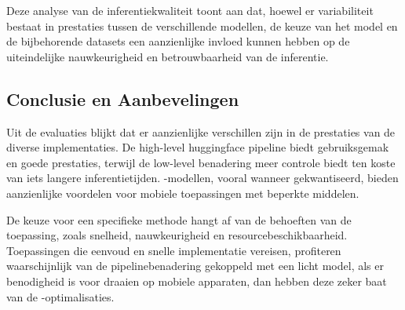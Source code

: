 Deze analyse van de inferentiekwaliteit toont aan dat, hoewel er variabiliteit bestaat in prestaties tussen de verschillende modellen, de keuze van het model en de bijbehorende datasets een aanzienlijke invloed kunnen hebben op de uiteindelijke nauwkeurigheid en betrouwbaarheid van de inferentie.

\subsection{Conclusie en Aanbevelingen}

Uit de evaluaties blijkt dat er aanzienlijke verschillen zijn in de prestaties van de diverse implementaties. De high-level \gls{huggingface} pipeline biedt gebruiksgemak en goede prestaties, terwijl de low-level benadering meer controle biedt ten koste van iets langere inferentietijden. -modellen, vooral wanneer gekwantiseerd, bieden aanzienlijke voordelen voor mobiele toepassingen met beperkte middelen.

De keuze voor een specifieke methode hangt af van de behoeften van de toepassing, zoals snelheid, nauwkeurigheid en resourcebeschikbaarheid. Toepassingen die eenvoud en snelle implementatie vereisen, profiteren waarschijnlijk van de pipelinebenadering gekoppeld met een licht model, als er benodigheid is voor draai\-en op mobiele apparaten, dan hebben deze zeker baat van de -optimalisaties.